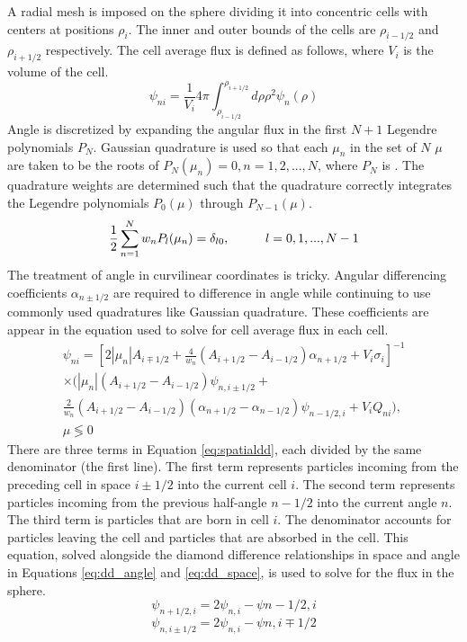 \documentclass[11pt, oneside]{article}   	%
\newcommand\tab[1][1cm]{\hspace*{#1}}				%
\begin{document}
A radial mesh is imposed on the sphere dividing it into concentric cells with centers at positions $\rho_i$. The inner and outer bounds of the cells are $\rho_{i-1/2}$ and $\rho_{i+1/2}$ respectively. The cell average flux is defined as follows, where $V_i$ is the volume of the cell.
%
\begin{equation}
\psi_{ni} = \frac{1}{V_i}4\pi\int_{\rho_{i-1/2}}^{\rho_{i+1/2}}{d\rho\rho^2\psi_n(\rho)}
\end{equation}
%
Angle is discretized by expanding the angular flux in the first $N+1$ Legendre polynomials $P_N$. Gaussian quadrature is used so that each $\mu_n$ in the set of $N$ $\mu$ are taken to be the roots of $P_N(\mu_n) = 0, n=1, 2,...,N$, where $P_N$ is . The quadrature weights are determined such that the quadrature correctly integrates the Legendre polynomials $P_0(\mu)$ through $P_{N-1}(\mu)$.
%
\begin{equation}
\frac{1}{2}\sum_{n=1}^N{w_n P_l(\mu_n)} = \delta_{l0}, \tab l = 0, 1, ..., N-1
\end{equation}
%
The treatment of angle in curvilinear coordinates is tricky. Angular differencing coefficients $\alpha_{n\pm1/2}$ are required to difference in angle while continuing to use commonly used quadratures like Gaussian quadrature. These coefficients are appear in the equation used to solve for cell average flux in each cell. 
%
\begin{equation}\label{eq:spatialdd}
\begin{aligned}
\psi_{ni} = \left[ 2\left| \mu_n \right| A_{i \mp 1/2} + \frac{4}{w_n}\left(A_{i+1/2}-A_{i-1/2}\right)\alpha_{n+1/2}+V_i\sigma_i \right]^{-1} \\
\times \bigg( \left| \mu_n \right| \left(A_{i+1/2}-A_{i-1/2}\right)\psi_{n,i \pm 1/2} + \\
\frac{2}{w_n}\left(A_{i+1/2}-A_{i-1/2}\right)\left(\alpha_{n+1/2}-\alpha_{n-1/2}\right)\psi_{n-1/2,i}+V_i Q_{ni} \bigg), \\
\mu \lessgtr 0
\end{aligned}
\end{equation}
%
There are three terms in Equation \ref{eq:spatialdd}, each divided by the same denominator (the first line). The first term represents particles incoming from the preceding cell in space $i \pm 1/2$ into the current cell $i$. The second term represents particles incoming from the previous half-angle $n-1/2$ into the current angle $n$. The third term is particles that are born in cell $i$. The denominator accounts for particles leaving the cell and particles that are absorbed in the cell. This equation, solved alongside the diamond difference relationships in space and angle in Equations \ref{eq:dd_angle} and \ref{eq:dd_space}, is used to solve for the flux in the sphere.
%
\begin{equation}\label{eq:dd_angle}
\psi_{n+1/2,i} = 2\psi_{n,i}-\psi{n-1/2,i}
\end{equation}
%
\begin{equation}\label{eq:dd_space}
\psi_{n,i \pm 1/2} = 2\psi_{n,i}-\psi{n,i\mp1/2}
\end{equation}
\end{document}
